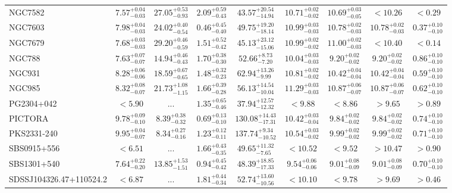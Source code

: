 \documentclass[onecolumn]{mn2e}
\begin{document}
{\begin{center}
\begin{longtable}{lcccccccc}
NGC7582 & $7.57_{-0.03}^{+0.04}$ & $27.05_{-0.93}^{+0.53}$ & $2.09_{-0.43}^{+0.59}$ &$43.57_{-14.94}^{+20.54}$ & $10.71_{-0.02}^{+0.02}$ & $10.69_{-0.05}^{+0.03}$ & $<10.26$ & $<0.29$ \\
NGC7603 & $7.98_{-0.03}^{+0.04}$ & $24.02_{-0.54}^{+0.40}$ & $0.46_{-0.40}^{+0.45}$ &$49.75_{-18.14}^{+19.20}$ & $10.99_{-0.03}^{+0.03}$ & $10.78_{-0.03}^{+0.02}$ & $10.78_{-0.03}^{+0.02}$ & $0.37_{-0.10}^{+0.10}$ \\
NGC7679 & $7.68_{-0.03}^{+0.03}$ & $29.20_{-0.59}^{+0.46}$ & $1.51_{-0.42}^{+0.52}$ &$45.13_{-15.06}^{+23.12}$ & $10.99_{-0.02}^{+0.02}$ & $11.00_{-0.03}^{+0.02}$ & $<10.40$ & $<0.14$ \\
NGC788 & $7.63_{-0.07}^{+0.07}$ & $14.94_{-0.43}^{+0.46}$ & $1.70_{-0.30}^{+0.38}$ &$52.66_{-7.20}^{+8.73}$ & $10.04_{-0.03}^{+0.03}$ & $9.20_{-0.02}^{+0.02}$ & $9.20_{-0.02}^{+0.02}$ & $0.86_{-0.10}^{+0.10}$ \\
NGC931 & $8.28_{-0.06}^{+0.06}$ & $18.59_{-0.65}^{+0.67}$ & $1.48_{-0.23}^{+0.32}$ &$62.94_{-9.99}^{+13.26}$ & $10.81_{-0.02}^{+0.02}$ & $10.42_{-0.04}^{+0.04}$ & $10.42_{-0.04}^{+0.04}$ & $0.59_{-0.10}^{+0.10}$ \\
NGC985 & $8.32_{-0.07}^{+0.08}$ & $21.73_{-1.15}^{+1.08}$ & $1.66_{-0.28}^{+0.39}$ &$56.13_{-10.04}^{+14.54}$ & $11.29_{-0.03}^{+0.03}$ & $10.87_{-0.07}^{+0.06}$ & $10.87_{-0.07}^{+0.06}$ & $0.62_{-0.10}^{+0.10}$ \\
PG2304+042 & $<5.90$ & ... & $1.35_{-0.46}^{+0.65}$ &$37.94_{-12.32}^{+12.57}$ & $<9.88$ & $<8.86$ & $>9.65$ & $>0.89$ \\
PICTORA & $9.78_{-0.10}^{+0.09}$ & $8.39_{-0.32}^{+0.38}$ & $0.69_{-0.10}^{+0.13}$ &$130.08_{-17.31}^{+14.43}$ & $10.42_{-0.04}^{+0.03}$ & $9.84_{-0.02}^{+0.02}$ & $9.84_{-0.02}^{+0.02}$ & $0.74_{-0.10}^{+0.10}$ \\
PKS2331-240 & $9.95_{-0.07}^{+0.04}$ & $8.34_{-0.16}^{+0.27}$ & $1.23_{-0.11}^{+0.12}$ &$137.74_{-10.52}^{+9.34}$ & $10.54_{-0.02}^{+0.03}$ & $9.99_{-0.02}^{+0.02}$ & $9.99_{-0.02}^{+0.02}$ & $0.71_{-0.10}^{+0.10}$ \\
SBS0915+556 & $<6.51$ & ... & $1.66_{-0.35}^{+0.43}$ &$49.65_{-7.65}^{+11.32}$ & $<10.52$ & $<9.52$ & $>10.47$ & $>0.90$ \\
SBS1301+540 & $7.64_{-0.20}^{+0.22}$ & $13.85_{-1.51}^{+1.53}$ & $0.94_{-0.42}^{+0.45}$ &$48.39_{-17.33}^{+18.85}$ & $9.54_{-0.06}^{+0.06}$ & $9.01_{-0.09}^{+0.08}$ & $9.01_{-0.09}^{+0.08}$ & $0.70_{-0.10}^{+0.10}$ \\
SDSSJ104326.47+110524.2 & $<6.87$ & ... & $1.81_{-0.34}^{+0.44}$ &$52.74_{-10.56}^{+13.60}$ & $<10.10$ & $<9.78$ & $>9.69$ & $>0.46$ \\

\end{longtable}
\end{center}}
\end{document}
